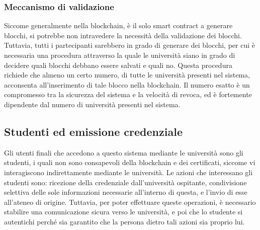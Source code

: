 \documentclass[a4paper,12pt]{article}
\begin{document}
\subsubsection{Meccanismo di validazione}
Siccome generalmente nella blockchain, è il solo smart contract a generare blocchi, si potrebbe non intravedere la necessità della validazione dei blocchi. Tuttavia, tutti i partecipanti sarebbero in grado di generare dei blocchi, per cui è necessaria una procedura attraverso la quale le università siano in grado di decidere quali blocchi debbano essere salvati e quali no. 
\newline Questa procedura richiede che almeno un certo numero, di tutte le università presenti nel sistema, acconsenta all'inserimento di tale blocco nella blockchain. Il numero esatto è un compromesso tra la sicurezza del sistema e la velocità di revoca, ed è fortemente dipendente dal numero di università presenti nel sistema.
\subsection{Studenti ed emissione credenziale}
Gli utenti finali che accedono a questo sistema mediante le università sono gli studenti, i quali non sono consapevoli della blockchain e dei certificati, siccome vi interagiscono indirettamente mediante le università. Le azioni che interessano gli studenti sono: ricezione della credenziale dall'università ospitante, condivisione selettiva delle sole informazioni necessarie all'interno di questa, e l'invio di esse all'ateneo di origine.
\newline Tuttavia, per poter effettuare queste operazioni, è necessario stabilire una comunicazione sicura verso le università, e poi che lo studente si autentichi perché sia garantito che la persona dietro tali azioni sia proprio lui.
\end{document}

